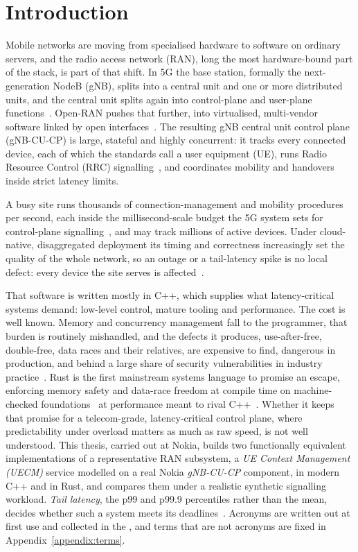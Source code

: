 \chapter{Introduction}

Mobile networks are moving from specialised hardware to software on ordinary servers, and the
radio access network (RAN), long the most hardware-bound part of the stack, is part of that
shift. In 5G the base station, formally the next-generation NodeB (gNB), splits into a central
unit and one or more distributed units, and the central unit splits again into control-plane and
user-plane functions~\cite{3gpp38401,3gpp38300}. Open-RAN pushes that further, into virtualised,
multi-vendor software linked by open interfaces~\cite{polese2023oran}. The resulting gNB central
unit control plane (gNB-CU-CP) is large, stateful and highly concurrent: it tracks every
connected device, each of which the standards call a user equipment (UE), runs Radio Resource
Control (RRC) signalling~\cite{3gpp38331}, and coordinates mobility and handovers inside strict
latency limits.

A busy site runs thousands of connection-management and mobility procedures per second, each
inside the millisecond-scale budget the 5G system sets for control-plane
signalling~\cite{3gpp38913}, and may track millions of active devices. Under cloud-native,
disaggregated deployment its timing and correctness increasingly set the quality of the whole
network, so an outage or a tail-latency spike is no local defect: every device the site serves is
affected~\cite{dean2013tail,barroso2017microseconds}.

That software is written mostly in C++, which supplies what latency-critical systems demand:
low-level control, mature tooling and performance. The cost is well known. Memory and concurrency
management fall to the programmer, that burden is routinely mishandled, and the defects it
produces, use-after-free, double-free, data races and their relatives, are expensive to find,
dangerous in production, and behind a large share of security vulnerabilities in industry
practice~\cite{msrc2019memory,google2022android}. Rust is the first mainstream systems language
to promise an escape, enforcing memory safety and data-race freedom at compile time on
machine-checked foundations~\cite{klabnik2023rust,jung2018rustbelt} at performance meant to rival
C++~\cite{balasubramanian2017rust}. Whether it keeps that promise for a telecom-grade,
latency-critical control plane, where predictability under overload matters as much as raw speed,
is not well understood. This thesis, carried out at Nokia, builds two functionally equivalent
implementations of a representative RAN subsystem, a \emph{UE Context Management (UECM)} service
modelled on a real Nokia \emph{gNB-CU-CP} component, in modern C++ and in Rust, and compares them
under a realistic synthetic signalling workload. \emph{Tail latency}, the p99 and p99.9
percentiles rather than the mean, decides whether such a system meets its
deadlines~\cite{dean2013tail,barroso2017microseconds}. Acronyms are written out at first use and
collected in the \nomname{}, and terms that are not acronyms are fixed in
Appendix~\ref{appendix:terms}.

